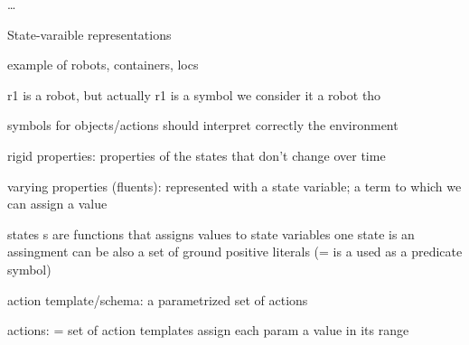\documentclass[11pt,a4paper]{article}
\theoremstyle{definition}
\theoremstyle{plain}
\theoremstyle{remark}
\begin{document}
\dots


State-varaible representations 

example of robots, containers, locs 

r1 is a robot, but actually r1 is a symbol 
we consider it a robot tho 

symbols for objects/actions should interpret correctly the environment
 

rigid properties: properties of the states that don't change over time 

varying properties (fluents): represented with a state variable; a term to which we can assign a value

states s are functions that assigns values to state variables
one state is an assingment 
can be also a set of ground positive literals (= is a used as a predicate symbol)


action template/schema: a parametrized set of actions 


actions: \A = set of action templates 
assign each param a value in its range 
\end{document}
